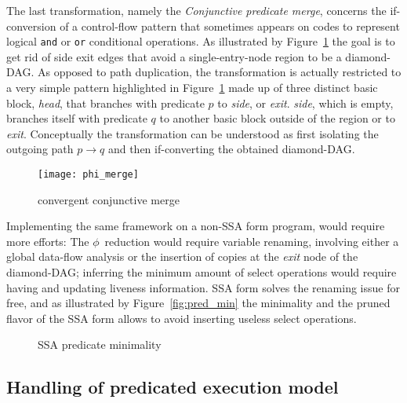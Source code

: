 The last transformation, namely the \emph{Conjunctive predicate merge}, concerns the if-conversion of a control-flow pattern that sometimes appears on codes to represent logical \texttt{and} or \texttt{or} conditional operations. As illustrated by Figure~\ref{fig:phi_merge} the goal is to get rid of side exit edges that avoid a single-entry-node region to be a diamond-DAG. As opposed to path duplication, the transformation is actually restricted to a very simple pattern highlighted in Figure~\ref{fig:phi_merge} made up of three distinct basic block, \textit{head}, that branches with predicate $p$ to \textit{side}, or \textit{exit}. \textit{side}, which is empty, branches itself with predicate $q$ to another basic block outside of the region or to \textit{exit}. Conceptually the transformation can be understood as first isolating the outgoing path $p\rightarrow q$ and then if-converting the obtained diamond-DAG. 

\begin{figure}[h]
  \texttt{[image: phi\_merge]}
  \caption{\label{fig:phi_merge}convergent conjunctive merge} 
\end{figure}

Implementing the same framework on a non-SSA form program, would require more efforts: The $\phi$~reduction would require variable renaming, involving either a global data-flow analysis or the insertion of copies at the \textit{exit} node of the diamond-DAG; inferring the minimum amount of {select} operations would require having and updating liveness information. SSA form solves the renaming issue for free, and as illustrated by Figure~\ref{fig:pred_min} the minimality and the pruned flavor of the SSA form allows to avoid inserting useless {select} operations.  

\begin{figure}[h]
\centering
  \hfill
\caption{\label{fig:pred_min} SSA predicate minimality}
\label{fig:minimality}
\end{figure}

\subsection{Handling of predicated execution model}

